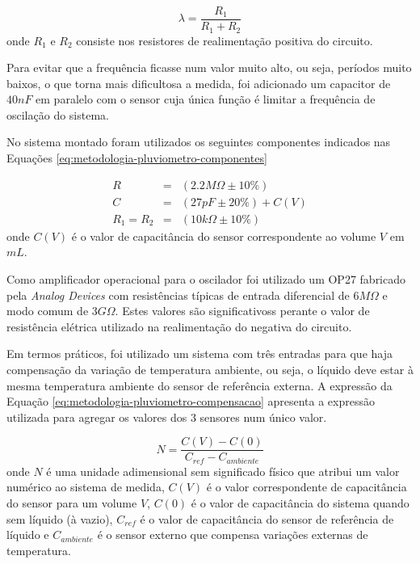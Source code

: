 \documentclass[a4paper]{instrumentacao}
\begin{document}
\begin{equation}
	\lambda = \frac{R_1}{R_1 + R_2}
	\label{eq:metologia-pluviometro-periodo-2}
\end{equation}
\noindent onde $R_1$ e $R_2$ consiste nos resistores de realimentação positiva do circuito.

Para evitar que a frequência ficasse num valor muito alto, ou seja, períodos muito baixos, o que torna mais dificultosa a medida, foi adicionado um capacitor de $40 nF$ em paralelo com o sensor cuja única função é limitar a frequência de oscilação do sistema.

No sistema montado foram utilizados os seguintes componentes indicados nas Equações \ref{eq:metodologia-pluviometro-componentes}

\begin{eqnarray}
	R &=& (2.2 M\Omega \pm 10\%) 		\label{eq:metodologia-pluviometro-componentes}					\\
	C &=& (27 pF \pm 20\%) + C(V) 		\nonumber			\\
	R_1 = R_2 &=& (10 k\Omega \pm 10\%)	\nonumber
\end{eqnarray}
\noindent onde $C(V)$ é o valor de capacitância do sensor correspondente ao volume $V$ em $mL$.

Como amplificador operacional para o oscilador foi utilizado um OP27 fabricado pela \textit{Analog Devices} com resistências típicas de entrada diferencial de $6 M\Omega$ e modo comum de $3 G\Omega$. Estes valores são significativoss perante o valor de resistência elétrica utilizado na realimentação do negativa do circuito.

Em termos práticos, foi utilizado um sistema com três entradas para que haja compensação da variação de temperatura ambiente, ou seja, o líquido deve estar à mesma temperatura ambiente do sensor de referência externa. A expressão da Equação \ref{eq:metodologia-pluviometro-compensacao} apresenta a expressão utilizada para agregar os valores dos 3 sensores num único valor.

\begin{equation}
	N = \frac{C(V) - C(0)}{C_{ref} - C_{ambiente}}
	\label{eq:metodologia-pluviometro-compensacao}
\end{equation}
\noindent onde $N$ é uma unidade adimensional sem significado físico que atribui um valor numérico ao sistema de medida, $C(V)$ é o valor correspondente de capacitância do sensor para um volume $V$, $C(0)$ é o valor de capacitância do sistema quando sem líquido (à vazio), $C_{ref}$ é o valor de capacitância do sensor de referência de líquido e $C_{ambiente}$ é o sensor externo que compensa variações externas de temperatura.
\end{document}
